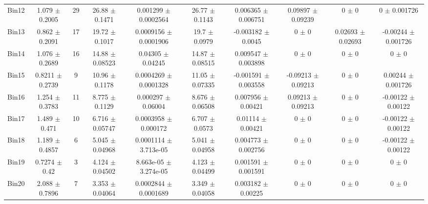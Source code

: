 \begin{tabular}{@{\extracolsep{4pt}}lccccccccc@{}}
     Bin12 & 1.079 $\pm$ 0.2005 & 29 & 26.88 $\pm$ 0.1471 & 0.001299 $\pm$ 0.0002564 & 26.77 $\pm$ 0.1143 & 0.006365 $\pm$ 0.006751 & 0.09897 $\pm$ 0.09239 & 0 $\pm$ 0 & 0 $\pm$ 0.001726 \\ 
     Bin13 & 0.862 $\pm$ 0.2091 & 17 & 19.72 $\pm$ 0.1017 & 0.0009156 $\pm$ 0.0001906 & 19.7 $\pm$ 0.0979 & -0.003182 $\pm$ 0.0045 & 0 $\pm$ 0 & 0.02693 $\pm$ 0.02693 & -0.00244 $\pm$ 0.001726 \\ 
     Bin14 & 1.076 $\pm$ 0.2689 & 16 & 14.88 $\pm$ 0.08523 & 0.04305 $\pm$ 0.04245 & 14.87 $\pm$ 0.08515 & 0.009547 $\pm$ 0.003898 & 0 $\pm$ 0 & 0 $\pm$ 0 & 0 $\pm$ 0 \\ 
     Bin15 & 0.8211 $\pm$ 0.2739 & 9 & 10.96 $\pm$ 0.1178 & 0.0004269 $\pm$ 0.0001328 & 11.05 $\pm$ 0.07335 & -0.001591 $\pm$ 0.003558 & -0.09213 $\pm$ 0.09213 & 0 $\pm$ 0 & 0.00244 $\pm$ 0.001726 \\ 
     Bin16 & 1.254 $\pm$ 0.3783 & 11 & 8.775 $\pm$ 0.1129 & 0.000297 $\pm$ 0.06004 & 8.676 $\pm$ 0.06508 & 0.007956 $\pm$ 0.00421 & 0.09213 $\pm$ 0.09213 & 0 $\pm$ 0 & -0.00122 $\pm$ 0.00122 \\ 
     Bin17 & 1.489 $\pm$ 0.471 & 10 & 6.716 $\pm$ 0.05747 & 0.0003958 $\pm$ 0.000172 & 6.707 $\pm$ 0.0573 & 0.01114 $\pm$ 0.00421 & 0 $\pm$ 0 & 0 $\pm$ 0 & -0.00122 $\pm$ 0.00122 \\ 
     Bin18 & 1.189 $\pm$ 0.4857 & 6 & 5.045 $\pm$ 0.04968 & 0.0001114 $\pm$ 3.713e-05 & 5.041 $\pm$ 0.04958 & 0.004773 $\pm$ 0.002756 & 0 $\pm$ 0 & 0 $\pm$ 0 & -0.00122 $\pm$ 0.00122 \\ 
     Bin19 & 0.7274 $\pm$ 0.42 & 3 & 4.124 $\pm$ 0.04502 & 8.663e-05 $\pm$ 3.274e-05 & 4.123 $\pm$ 0.04499 & 0.001591 $\pm$ 0.001591 & 0 $\pm$ 0 & 0 $\pm$ 0 & 0 $\pm$ 0 \\ 
     Bin20 & 2.088 $\pm$ 0.7896 & 7 & 3.353 $\pm$ 0.04064 & 0.0002844 $\pm$ 0.0001689 & 3.349 $\pm$ 0.04058 & 0.003182 $\pm$ 0.00225 & 0 $\pm$ 0 & 0 $\pm$ 0 & 0 $\pm$ 0 \\ 
\hline\hline
  \end{tabular}
